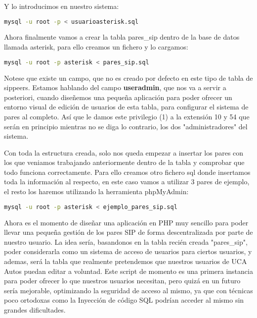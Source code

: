 {Y lo introducimos en nuestro sistema:

\begin{lstlisting}[language=sh]
mysql -u root -p < usuarioasterisk.sql
\end{lstlisting}

Ahora finalmente vamos a crear la tabla pares\_sip dentro de la base de datos llamada asterisk, para ello creamos un fichero y lo cargamos:



\begin{lstlisting}[language=sh]
mysql -u root -p asterisk < pares_sip.sql
\end{lstlisting}

Notese que existe un campo, que no es creado por defecto en este tipo de tabla de sippeers. Estamos hablando del campo \textbf{useradmin}, que nos va a servir a posteriori, cuando diseñemos una pequeña aplicación para poder ofrecer un entorno visual de edición de usuarios de esta tabla, para configurar el sistema de pares al completo. Así que le damos este privilegio (1) a la extensión 10 y 54 que serán en principio mientras no se diga lo contrario, los dos "administradores" del sistema.

Con toda la estructura creada, solo nos queda empezar a insertar los pares con los que veniamos trabajando anteriormente dentro de la tabla y comprobar que todo funciona correctamente. Para ello creamos otro fichero sql donde insertamos toda la información al respecto, en este caso vamos a utilizar 3 pares de ejemplo, el resto los haremos utilizando la herramienta phpMyAdmin:



\begin{lstlisting}[language=sh]
mysql -u root -p asterisk < ejemplo_pares_sip.sql
\end{lstlisting}

Ahora es el momento de diseñar una aplicación en PHP muy sencillo para poder llevar una pequeña gestión de los pares SIP de forma descentralizada por parte de nuestro usuario. La idea sería, basandonos en la tabla recién creada "pares\_sip", poder considerarla como un sistema de acceso de usuarios para ciertos usuarios, y ademas, será la tabla que realmente pretendemos que nuestros usuarios de UCA Autos puedan editar a voluntad. Este script de momento es una primera instancia para poder ofrecer lo que nuestros usuarios necesitan, pero quizá en un futuro sería mejorable, optimizando la seguridad de acceso al mismo, ya que con técnicas poco ortodoxas como la Inyección de código SQL podrían acceder al mismo sin grandes dificultades.

}
